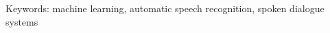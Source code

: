 \documentclass[12pt,a4paper]{report}
\let\openright=\clearpage
\def\chapwithtoc#1{
\chapter*{#1}
\addcontentsline{toc}{chapter}{#1}
}
\begin{document}
{%

Keywords:
machine learning, automatic speech recognition, spoken dialogue systems

\vss}

\newpage


\openright
\pagestyle{plain}
\setcounter{page}{1}
\tableofcontents








% 





\listoftables






\openright
\end{document}
